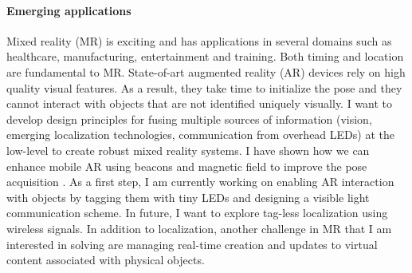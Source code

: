 \documentclass[10pt]{article}
\begin{document}
\paragraph{Emerging applications}
Mixed reality (MR) is exciting and has applications in several domains such as healthcare, manufacturing, entertainment and training.
Both timing and location are fundamental to MR. State-of-art augmented reality (AR) devices rely on high quality visual features. As a result, they take time to initialize the pose and they cannot interact with objects that 
are not identified uniquely visually.  %
I want to develop design principles for fusing multiple sources of information (vision, emerging localization technologies, communication from overhead LEDs) at the low-level to create robust mixed reality systems. %
I have shown how we can enhance mobile AR using beacons and magnetic field to improve the pose acquisition \cite{mobileAR}. As a first step, I am currently working on enabling AR interaction with objects by tagging them with tiny LEDs and designing a visible light communication scheme. In future, I want to explore tag-less localization using wireless signals. 
In addition to localization, another challenge in MR that I am interested in solving are managing real-time creation and updates to virtual content associated with physical
objects. %
\end{document}
